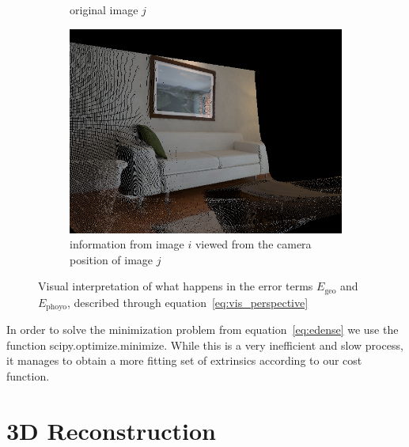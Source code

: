 \begin{figure}[ht]
\begin{subfigure}[b]{.45\textwidth}
                \caption{original image $j$}
                \label{sfig:j_original}
            \end{subfigure}
            \begin{subfigure}[b]{.45\textwidth}
                \includegraphics[width=.95\textwidth]{images/vis_perspective_02}
                \caption{information from image $i$ viewed from the camera position of image $j$}
                \label{sfig:i_from_j}
            \end{subfigure}
            \caption[]{Visual interpretation of what happens in the error terms $E_{\text{geo}}$ and $E_{\text{phoyo}}$, described through equation~\ref{eq:vis_perspective}}
            \label{fig:vis_perspective}
        \end{figure}
        In order to solve the minimization problem from equation~\ref{eq:edense} we use the function scipy.optimize.minimize.
        While this is a very inefficient and slow process, it manages to obtain a more fitting set of extrinsics according to our cost function.
    \section{3D Reconstruction}
